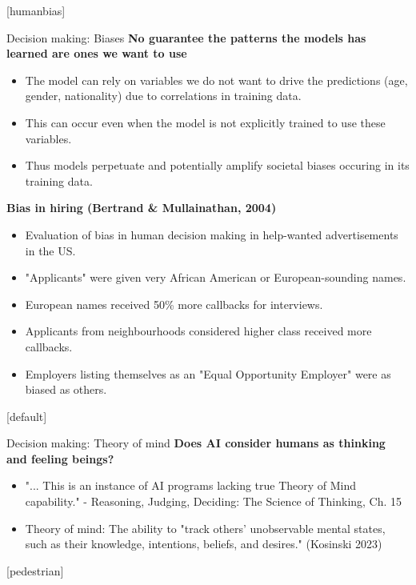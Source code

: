 \documentclass[8pt]{beamer}
\begin{document}
	[humanbias]

	\begin{frame}[t]{Decision making: Biases} %
		\textbf{No guarantee the patterns the models has learned are ones we want to use}
		\begin{itemize}
			\item The model can rely on variables we do not want to drive the predictions (age, gender, nationality) due to correlations in training data.
			\item This can occur even when the model is not explicitly trained to use these variables.
			\item Thus models perpetuate and potentially amplify societal biases occuring in its training data.
		\end{itemize}
		\textbf{Bias in hiring (Bertrand \& Mullainathan, 2004)}
		\begin{itemize}
			\item Evaluation of bias in human decision making in help-wanted advertisements in the US.
			\item "Applicants" were given very African American or European-sounding names.
			\item European names received 50\% more callbacks for interviews.
			\item Applicants from neighbourhoods considered higher class received more callbacks.
			\item Employers listing themselves as an "Equal Opportunity Employer" were as biased as others.
		\end{itemize}
	\end{frame}

	[default]

	\begin{frame}[t]{Decision making: Theory of mind}
		\textbf{Does AI consider humans as thinking and feeling beings?}
		\begin{itemize}
			\item "... This is an instance of AI programs lacking true Theory of Mind capability." - Reasoning, Judging, Deciding: The Science of Thinking, Ch. 15
			\item Theory of mind: The ability to "track others' unobservable mental states, such as their knowledge, intentions, beliefs, and desires." (Kosinski 2023)
		\end{itemize}
	\end{frame}

	[pedestrian]
\end{document}
